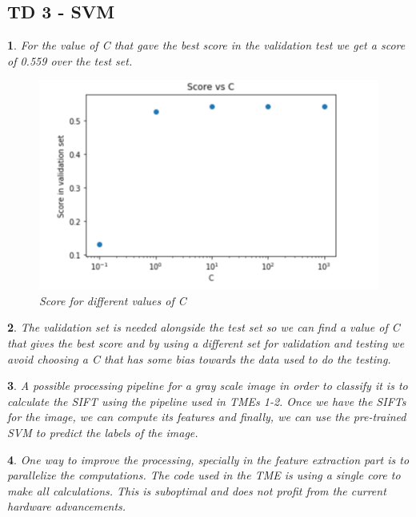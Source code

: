\documentclass[10pt]{article} %
\theoremstyle{question-style}
\newtheorem{answer}{\arabic{answer}}
\begin{document}
\begin{flushleft}
\section*{TD 3 - SVM}
\begin{answer} %
For the value of C that gave the best score in the validation test we get a score of 0.559 over the test set.
\begin{figure}[htbp]
	\centering
	\includegraphics[width=0.5\columnwidth]{d.png}
	\caption{Score for different values of C}
\end{figure}
\end{answer}
\begin{answer}
The validation set is needed alongside the test set so we can find a value of C that gives the best score and by using a different set for validation and testing we avoid choosing a C that has some bias towards the data used to do the testing.
\end{answer}
\begin{answer}
A possible processing pipeline for a gray scale image in order to classify it is to calculate the SIFT using the pipeline used in TMEs 1-2. Once we have the SIFTs for the image, we can compute its features and finally, we can use the pre-trained SVM to predict the labels of the image.
\end{answer}
\begin{answer}
One way to improve the processing, specially in the feature extraction part is to parallelize the computations. The code used in the TME is using a single core to make all calculations. This is suboptimal and does not profit from the current hardware advancements.
\end{answer}

\end{flushleft}
\end{document}
